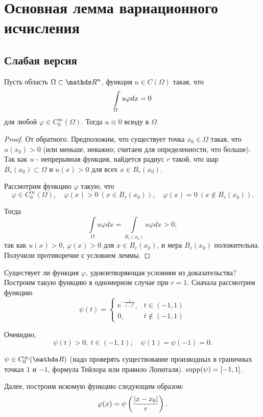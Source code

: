 \section{Основная лемма вариационного исчисления}
\subsection{Слабая версия}
\begin{lemma}
Пусть область $\Omega \subset \real^n$, функция $u \in C(\Omega)$ такая, что 
$$\displaystyle \int \limits_{\Omega} u \varphi dx = 0$$ 
для любой $\varphi \in C_0^\infty(\Omega)$. Тогда $u \equiv 0$ всюду в $\Omega$.
\end{lemma}

\begin{proof}
От обратного. Предположим, что существует точка $x_0 \in \Omega$ такая, что $u(x_0) > 0$ (или меньше, неважно; считаем для определенности, что больше). 
Так как $u$ - непрерывная функция, найдется радиус $r$ такой, что шар $B_r(x_0) \subset \Omega$ и $u(x) > 0$ для всех $x \in B_r(x_0)$.

Рассмотрим функцию $\varphi$ такую, что 
$$\varphi \in C_0^\infty(\Omega),\quad \varphi(x) > 0 \ (x \in B_r(x_0)),\quad \varphi(x) = 0 \ (x \notin B_r(x_0)).$$

Тогда
$$\int \limits_{\Omega} u \varphi dx = \int \limits_{B_r(x_0)} u \varphi dx > 0,$$ 
так как $u(x) > 0$, $\varphi(x) > 0$ для $x \in B_r(x_0)$, и мера $B_r(x_0)$ положительна. Получили противоречие с условием леммы.
\end{proof}

\begin{note}
Существует ли функция $\varphi$, удовлетворяющая условиям из доказательства? 
Построим такую функцию в одномерном случае при $r = 1$. Сначала рассмотрим функцию
$$
    \psi(t) =
        \begin{cases} 
            \mathrm{e}^{-\frac{1}{1 - t^2}}, & t \in (-1, 1) \\
            0, & t \notin (-1, 1) 
        \end{cases}
$$

Очевидно, 
$$\psi(t) > 0, \ t \in (-1, 1); \quad \psi(1) = \psi(-1) = 0.$$ 

$\psi \in C_0^\infty(\real)$ (надо проверять существование производных в граничных точках $1$ и $-1$, формула Тейлора или правило Лопиталя). 
$\operatorname{supp}(\psi) = [-1, 1]$.

Далее, построим искомую функцию следующим образом:
$$\varphi(x) = \psi \left(\frac{\lvert x - x_0\rvert}{r}\right).$$
\end{note}

